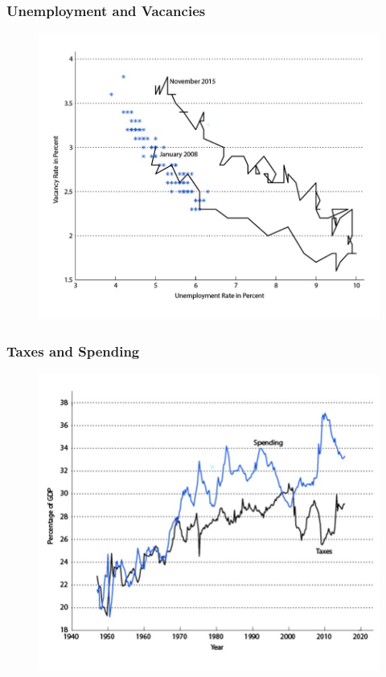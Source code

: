 \documentclass{beamer}
\begin{document}
\begin{frame}
\frametitle[alignment=center]{Unemployment and Vacancies}
\begin{figure}
\includegraphics[scale=0.6]{Figures/W_Fig_1pt7.png}
\end{figure}
\end{frame}


\begin{frame}
\frametitle[alignment=center]{Taxes and Spending}
\begin{figure}
\includegraphics[scale=0.6]{Figures/W_Fig_1pt8.png}
\end{figure}
\end{frame}
\end{document}
